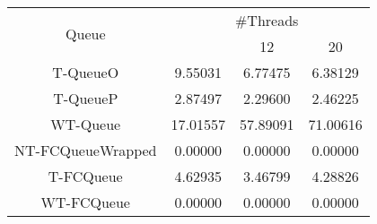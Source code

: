 \begin{tabular}{|c|c|c|c|}
\hline
\multirow{2}{*}{Queue} & \multicolumn{3}{c|}{\#Threads}\\\cline{2-4}& \quad 4 & 12 & 20\\
\hline
\hline
T-QueueO & 9.55031 & 6.77475 & 6.38129\\
T-QueueP & 2.87497 & 2.29600 & 2.46225\\
WT-Queue & 17.01557 & 57.89091 & 71.00616\\
NT-FCQueueWrapped & 0.00000 & 0.00000 & 0.00000\\
T-FCQueue & 4.62935 & 3.46799 & 4.28826\\
WT-FCQueue & 0.00000 & 0.00000 & 0.00000\\
\hline\end{tabular}
